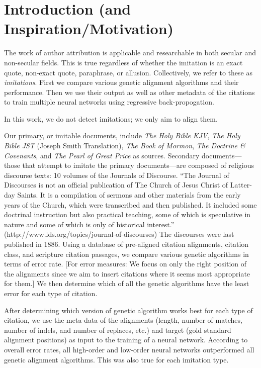 \section {Introduction (and Inspiration/Motivation)}

The work of author attribution is applicable and researchable in both secular and non-secular fields. This is true regardless of whether the imitation is an exact quote, non-exact quote, paraphrase, or allusion. Collectively, we refer to these as \textit{imitations}. First we compare various genetic alignment algorithms and their performance. Then we use their output as well as other metadata of the citations to train multiple neural networks using regressive back-propogation. 

In this work, we do not detect imitations; we only aim to align them. 

Our primary, or imitable documents, include \textit{The Holy Bible KJV}, \textit{The Holy Bible JST} (Joseph Smith Translation), \textit{The Book of Mormon}, \textit{The Doctrine \& Covenants}, and \textit{The Pearl of Great Price} as sources. Secondary documents---those that attempt to imitate the primary documents---are composed of religious discourse texts: 10 volumes of the Journals of Discourse. ``The Journal of Discourses is not an official publication of The Church of Jesus Christ of Latter-day Saints. It is a compilation of sermons and other materials from the early years of the Church, which were transcribed and then published. It included some doctrinal instruction but also practical teaching, some of which is speculative in nature and some of which is only of historical interest.'' (http://www.lds.org/topics/journal-of-discourses) The discourses were last published in 1886. Using a database of pre-aligned citation alignments, citation class, and scripture citation passages, we compare various genetic algorithms in terms of error rate. %
[For error measures: We focus on only the right position of the alignments since we aim to insert citations where it seems most appropriate for them.] We then determine which of all the genetic algorithms have the least error for each type of citation.

After determining which version of genetic algorithm works best for each type of citation, we use the meta-data of the alignments (length, number of matches, number of indels, and number of replaces, etc.) and target (gold standard alignment positions) as input to the training of a neural network. %
According to overall error rates, all high-order and low-order neural networks outperformed all genetic alignment algorithms. This was also true for each imitation type.

